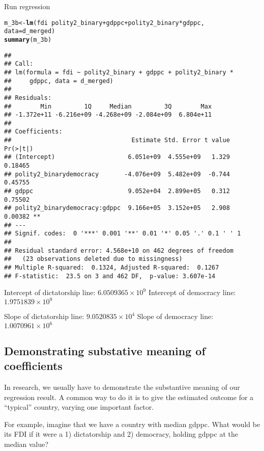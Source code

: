 \documentclass{article}\usepackage[]{graphicx}\usepackage[]{color}
\makeatletter
\newcommand{\hlopt}[1]{\textcolor[rgb]{0,0,0}{#1}}%
\newcommand{\hlstd}[1]{\textcolor[rgb]{0.345,0.345,0.345}{#1}}%
\newcommand{\hlkwb}[1]{\textcolor[rgb]{0.69,0.353,0.396}{#1}}%
\newcommand{\hlkwc}[1]{\textcolor[rgb]{0.333,0.667,0.333}{#1}}%
\newcommand{\hlkwd}[1]{\textcolor[rgb]{0.737,0.353,0.396}{\textbf{#1}}}%
\newenvironment{kframe}{%
 \def\at@end@of@kframe{}%
 \ifinner\ifhmode%
  \def\at@end@of@kframe{\end{minipage}}%
  \begin{minipage}{\columnwidth}%
 \fi\fi%
 \def\FrameCommand##1{\hskip\@totalleftmargin \hskip-\fboxsep
 \colorbox{shadecolor}{##1}\hskip-\fboxsep
     \hskip-\linewidth \hskip-\@totalleftmargin \hskip\columnwidth}%
 \MakeFramed {\advance\hsize-\width
   \@totalleftmargin\z@ \linewidth\hsize
   \@setminipage}}%
 {\par\unskip\endMakeFramed%
 \at@end@of@kframe}
\newenvironment{knitrout}{}{} %
\makeatother
\begin{document}
Run regression
\begin{knitrout}
\color{fgcolor}\begin{kframe}
\begin{alltt}
\hlstd{m_3b} \hlkwb{<-} \hlkwd{lm}\hlstd{(fdi} \hlopt{~} \hlstd{polity2_binary} \hlopt{+} \hlstd{gdppc} \hlopt{+} \hlstd{polity2_binary} \hlopt{*} \hlstd{gdppc,}
           \hlkwc{data} \hlstd{= d_merged)}
\hlkwd{summary}\hlstd{(m_3b)}
\end{alltt}
\begin{verbatim}
## 
## Call:
## lm(formula = fdi ~ polity2_binary + gdppc + polity2_binary * 
##     gdppc, data = d_merged)
## 
## Residuals:
##        Min         1Q     Median         3Q        Max 
## -1.372e+11 -6.216e+09 -4.268e+09 -2.084e+09  6.804e+11 
## 
## Coefficients:
##                                 Estimate Std. Error t value Pr(>|t|)   
## (Intercept)                    6.051e+09  4.555e+09   1.329  0.18465   
## polity2_binarydemocracy       -4.076e+09  5.482e+09  -0.744  0.45755   
## gdppc                          9.052e+04  2.899e+05   0.312  0.75502   
## polity2_binarydemocracy:gdppc  9.166e+05  3.152e+05   2.908  0.00382 **
## ---
## Signif. codes:  0 '***' 0.001 '**' 0.01 '*' 0.05 '.' 0.1 ' ' 1
## 
## Residual standard error: 4.568e+10 on 462 degrees of freedom
##   (23 observations deleted due to missingness)
## Multiple R-squared:  0.1324,	Adjusted R-squared:  0.1267 
## F-statistic:  23.5 on 3 and 462 DF,  p-value: 3.607e-14
\end{verbatim}
\end{kframe}
\end{knitrout}

Intercept of dictatorship line: \ensuremath{6.0509365\times 10^{9}}
Intercept of democracy line: \ensuremath{1.9751839\times 10^{9}}

Slope of dictatorship line: \ensuremath{9.0520835\times 10^{4}}
Slope of democracy line: \ensuremath{1.0070961\times 10^{6}}

\subsection{Demonstrating substative meaning of coefficients}

In research, we usually have to demonstrate the substantive meaning of our regression result. A common way to do it is to give the estimated outcome for a ``typical'' country, varying one important factor.

For example, imagine that we have a country with median gdppc. What would be its FDI if it were a 1) dictatorship and 2) democracy, holding gdppc at the median value?
\end{document}
